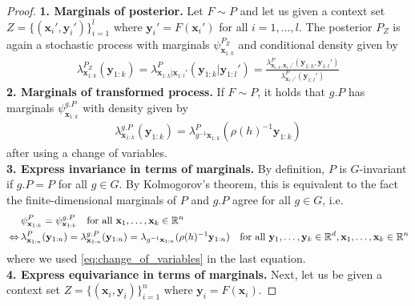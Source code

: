 \begin{proof}
	\textbf{1.
		Marginals of posterior.
	}
	Let $F\sim P$ and let us given a context set $Z=\{(\mathbf{x}_i',\mathbf{y}_i')\}_{i=1}^{l}$ where $\mathbf{y}_i'=F(\mathbf{x}_i')$ for all $i=1,\dots,l$.
	The posterior $P_Z$ is again a stochastic process with marginals $\psi_{\mathbf{x}_{1:k}}^{P_Z}$ and conditional density given by \begin{align} \label{eq:cond_density} \lambda_{\mathbf{x}_{1:k}}^{P_Z}(\mathbf{y}_{1:k})= \lambda_{\mathbf{x}_{1:k}|\mathbf{x}_{1:l}'}^{P}(\mathbf{y}_{1:k}|\mathbf{y}_{1:l}')=\frac{\lambda_{\mathbf{x}_{1:k},\mathbf{x}_{1:l}'}^P(\mathbf{y}_{1:k},\mathbf{y}_{1:l}')}{ \lambda_{\mathbf{x}_{1:l}'}^{P}(\mathbf{y}_{1:l}') } \end{align} \textbf{2.
		Marginals of transformed process.
	}
	If $F\sim P$, it holds that $g.P$ has marginals $\psi_{\mathbf{x}_{1:k}}^{g.P}$ with density given by \begin{align} \label{eq:change_of_variables} \lambda_{\mathbf{x}_{1:k}}^{g.P}(\mathbf{y}_{1:k})=\lambda_{g^{-1}\mathbf{x}_{1:k}}^{P}(\rho(h)^{-1}\mathbf{y}_{1:k}) \end{align} after using a change of variables.
	\\
	\textbf{3.
		Express invariance in terms of marginals.
	}
	By definition, $P$ is $G$-invariant if $g.P=P$ for all $g\in G.
	$ By Kolmogorov's theorem, this is equivalent to the fact the finite-dimensional marginals of $P$ and $g.
		P$ agree for all $g\in G$, i.e. \begin{align} &\psi_{\mathbf{x}_{1:k}}^{P}=\psi_{\mathbf{x}_{1:k}}^{g.P}\quad\text{for all }\mathbf{x}_1,\dots,\mathbf{x}_k\in\mathbb{R}^n\\ \,\Leftrightarrow\,& \label{eq:invariant_density} \lambda_{\mathbf{x}_{1:n}}^P(\mathbf{y}_{1:n})= \lambda_{\mathbf{x}_{1:n}}^{g.P}(\mathbf{y}_{1:n})=\lambda_{g^{-1}\mathbf{x}_{1:n}}(\rho(h)^{-1}\mathbf{y}_{1:n})\quad\text{for all }\mathbf{y}_1,\dots,\mathbf{y}_k\in\mathbb{R}^d,\mathbf{x}_1,\dots,\mathbf{x}_k\in\mathbb{R}^n \end{align} where we used \cref{eq:change_of_variables} in the last equation.
	\\
	\textbf{4.
		Express equivariance in terms of marginals.
	}
	Next, let us be given a context set $Z=\{(\mathbf{x}_i,\mathbf{y}_i)\}_{i=1}^{n}$ where $\mathbf{y}_i=F(\mathbf{x}_i)$.

\end{proof}
